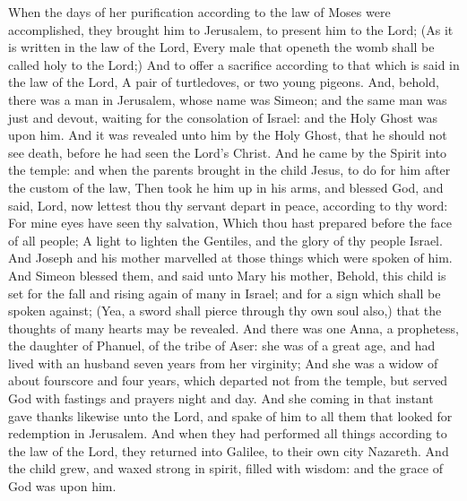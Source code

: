 
 When the days of her purification according to the law of Moses were accomplished, they brought him to Jerusalem, to present him to the Lord; (As it is written in the law of the Lord, Every male that openeth the womb shall be called holy to the Lord;) And to offer a sacrifice according to that which is said in the law of the Lord, A pair of turtledoves, or two young pigeons. And, behold, there was a man in Jerusalem, whose name was Simeon; and the same man was just and devout, waiting for the consolation of Israel: and the Holy Ghost was upon him. And it was revealed unto him by the Holy Ghost, that he should not see death, before he had seen the Lord's Christ. And he came by the Spirit into the temple: and when the parents brought in the child Jesus, to do for him after the custom of the law, Then took he him up in his arms, and blessed God, and said, Lord, now lettest thou thy servant depart in peace, according to thy word: For mine eyes have seen thy salvation, Which thou hast prepared before the face of all people; A light to lighten the Gentiles, and the glory of thy people Israel. And Joseph and his mother marvelled at those things which were spoken of him. And Simeon blessed them, and said unto Mary his mother, Behold, this child is set for the fall and rising again of many in Israel; and for a sign which shall be spoken against; (Yea, a sword shall pierce through thy own soul also,) that the thoughts of many hearts may be revealed. And there was one Anna, a prophetess, the daughter of Phanuel, of the tribe of Aser: she was of a great age, and had lived with an husband seven years from her virginity; And she was a widow of about fourscore and four years, which departed not from the temple, but served God with fastings and prayers night and day. And she coming in that instant gave thanks likewise unto the Lord, and spake of him to all them that looked for redemption in Jerusalem. And when they had performed all things according to the law of the Lord, they returned into Galilee, to their own city Nazareth. And the child grew, and waxed strong in spirit, filled with wisdom: and the grace of God was upon him.

